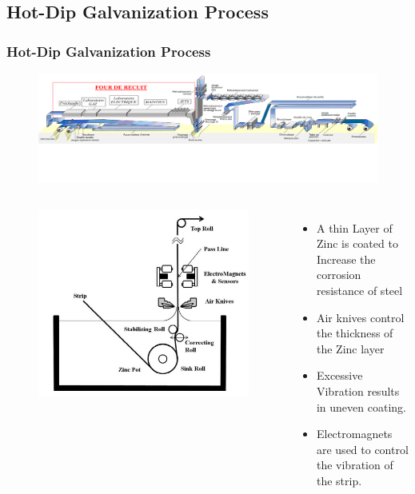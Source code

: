 \documentclass[9pt]{beamer}
\begin{document}
\subsection{Hot-Dip Galvanization Process}
\begin{frame}
\frametitle{Hot-Dip Galvanization Process}
\begin{figure}[h!]
  \includegraphics[width=1\linewidth,trim={0cm 4cm 0cm 0},clip]{galva_line.png}
\end{figure}
\begin{columns}

\begin{figure}[h!]
  \includegraphics[width=1\linewidth,trim={0 0 0 1cm},clip]{hotdip.png}
\end{figure}
\begin{itemize}
\item A thin Layer of Zinc is coated to Increase the corrosion resistance of steel
\item Air knives control the thickness of the Zinc layer
\item Excessive Vibration results in uneven coating.
\item Electromagnets are used to control the  vibration of the strip. 
\end{itemize}
\end{columns}
\end{frame}
\end{document}
